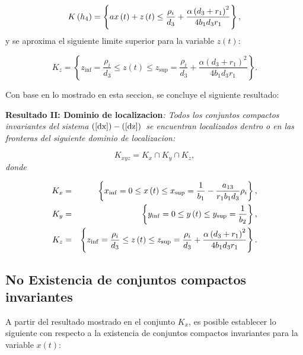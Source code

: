 \documentclass[letterpaper,11pt]{article}
\begin{document}
\begin{equation*}
K\left( h_{4}\right) =\left\{ ax\left( t\right) +z\left( t\right) \leq \frac{%
\rho _{i}}{d_{3}}+\frac{\alpha \left( d_{3}+r_{1}\right) ^{2}}{%
4b_{1}d_{3}r_{1}}\right\} ,
\end{equation*}%
y se aproxima el siguiente limite superior para la variable $z\left(
t\right) $:

\begin{equation*}
K_{z}=\left\{ z_{\inf }=\frac{\rho _{i}}{d_{3}}\leq z\left( t\right) \leq
z_{\sup }=\frac{\rho _{i}}{d_{3}}+\frac{\alpha \left( d_{3}+r_{1}\right) ^{2}%
}{4b_{1}d_{3}r_{1}}\right\} .
\end{equation*}

Con base en lo mostrado en esta seccion, se concluye el siguiente resultado:

\bigskip 

\textbf{Resultado II: Dominio de localizacion}\textit{: Todos los conjuntos
compactos invariantes del sistema }$\left( \ref{dx}\right) -\left( \ref{dz}%
\right) $\textit{\ se encuentran localizados dentro o en las fronteras del
siguiente dominio de localizacion:}

\bigskip 
\begin{equation*}
K_{xyz}=K_{x}\cap K_{y}\cap K_{z},
\end{equation*}%
\textit{donde}

\bigskip 
\begin{eqnarray*}
K_{x} &=&\left\{ x_{\inf }=0\leq x\left( t\right) \leq x_{\sup }=\frac{1}{%
b_{1}}-\frac{a_{13}}{r_{1}b_{1}d_{3}}\rho _{i}\right\} , \\
K_{y} &=&\left\{ y_{\inf }=0\leq y\left( t\right) \leq y_{\sup }=\frac{1}{%
b_{2}}\right\} , \\
K_{z} &=&\left\{ z_{\inf }=\frac{\rho _{i}}{d_{3}}\leq z\left( t\right) \leq
z_{\sup }=\frac{\rho _{i}}{d_{3}}+\frac{\alpha \left( d_{3}+r_{1}\right) ^{2}%
}{4b_{1}d_{3}r_{1}}\right\} .
\end{eqnarray*}

\subsection{\protect\bigskip No Existencia de conjuntos compactos invariantes%
}

A partir del resultado mostrado en el conjunto $K_{x}$, es posible
establecer lo siguiente con respecto a la existencia de conjuntos compactos
invariantes para la variable $x\left( t\right) $:
\end{document}
